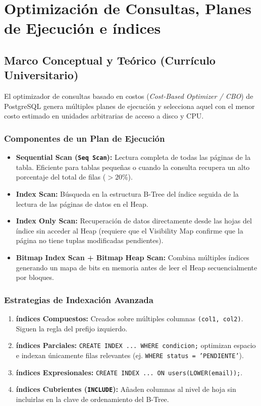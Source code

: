 \chapter{Optimizaci\'on de Consultas, Planes de Ejecuci\'on e \'indices}
\label{cap:optimizacion_explain_indices}

\section{Marco Conceptual y Te\'orico (Curr\'iculo Universitario)}

El optimizador de consultas basado en costos (\textit{Cost-Based Optimizer / CBO}) de PostgreSQL genera m\'ultiples planes de ejecuci\'on y selecciona aquel con el menor costo estimado en unidades arbitrarias de acceso a disco y CPU.

\subsection{Componentes de un Plan de Ejecuci\'on}
\begin{itemize}
    \item \textbf{Sequential Scan (\texttt{Seq Scan}):} Lectura completa de todas las p\'aginas de la tabla. Eficiente para tablas peque\~nas o cuando la consulta recupera un alto porcentaje del total de filas ($>20\%$).
    \item \textbf{Index Scan:} B\'usqueda en la estructura B-Tree del \'indice seguida de la lectura de las p\'aginas de datos en el Heap.
    \item \textbf{Index Only Scan:} Recuperaci\'on de datos directamente desde las hojas del \'indice sin acceder al Heap (requiere que el Visibility Map confirme que la p\'agina no tiene tuplas modificadas pendientes).
    \item \textbf{Bitmap Index Scan + Bitmap Heap Scan:} Combina m\'ultiples \'indices generando un mapa de bits en memoria antes de leer el Heap secuencialmente por bloques.
\end{itemize}

\subsection{Estrategias de Indexaci\'on Avanzada}
\begin{enumerate}
    \item \textbf{\'indices Compuestos:} Creados sobre m\'ultiples columnas \texttt{(col1, col2)}. Siguen la regla del prefijo izquierdo.
    \item \textbf{\'indices Parciales:} \texttt{CREATE INDEX ... WHERE condicion;} optimizan espacio e indexan \'unicamente filas relevantes (ej. \texttt{WHERE status = 'PENDIENTE'}).
    \item \textbf{\'indices Expresionales:} \texttt{CREATE INDEX ... ON users(LOWER(email));}.
    \item \textbf{\'indices Cubrientes (\texttt{INCLUDE}):} A\~naden columnas al nivel de hoja sin incluirlas en la clave de ordenamiento del B-Tree.
\end{enumerate}

